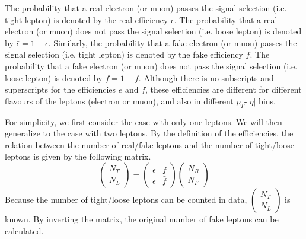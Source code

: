 The probability that a real electron (or muon) passes the signal selection (i.e. tight lepton) is denoted by the real efficiency $\epsilon$.
The probability that a real electron (or muon) does not pass the signal selection (i.e. loose lepton) is denoted by $\bar{\epsilon} = 1 - \epsilon$.
Similarly, the probability that a fake electron (or muon) passes the signal selection (i.e. tight lepton) is denoted by the fake efficiency $f$.
The probability that a fake electron (or muon) does not pass the signal selection (i.e. loose lepton) is denoted by $\bar{f} = 1 - f$.
Although there is no subscripts and superscripts for the efficiencies $e$ and $f$, these efficiencies are different for different flavours of the leptons (electron or muon), and also in different $p_T$-$|\eta|$ bins.

For simplicity, we first consider the case with only one leptons. We will then generalize to the case with two leptons.
By the definition of the efficiencies, the relation between the number of real/fake leptons and the number of tight/loose leptons is given by the following matrix.
\begin{equation}
\left( \begin{array}{c}
N_T \\
N_L
\end{array} \right)
=
\left( \begin{array}{cc}
\epsilon & f \\
\bar{\epsilon} & \bar{f}
\end{array} \right)
\left( \begin{array}{c}
N_R \\
N_F
\end{array} \right)
\label{equ:fake_eff_def}
\end{equation}
Because the number of tight/loose leptons can be counted in data, $\left( \begin{array}{c}
N_T \\
N_L
\end{array} \right)$ is known.
By inverting the matrix, the original number of fake leptons can be calculated.
